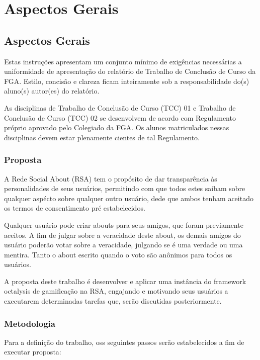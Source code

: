 \part{Aspectos Gerais}

\chapter[Aspectos Gerais]{Aspectos Gerais}

Estas instruções apresentam um conjunto mínimo de exigências necessárias a 
uniformidade de apresentação do relatório de Trabalho de Conclusão de Curso 
da FGA. Estilo, concisão e clareza ficam inteiramente sob a 
responsabilidade do(s) aluno(s) autor(es) do relatório.

As disciplinas de Trabalho de Conclusão de Curso (TCC) 01 e Trabalho de 
Conclusão de Curso (TCC) 02 se desenvolvem de acordo com Regulamento 
próprio aprovado pelo Colegiado da FGA. Os alunos matriculados nessas 
disciplinas devem estar plenamente cientes de tal Regulamento. 

\section{Proposta}
\label{sec:proposta}
A Rede Social About (RSA) tem o propósito de dar transparência às personalidades de seus usuários, permitindo com que todos
estes saibam sobre qualquer aspécto sobre qualquer outro usuário, dede que ambos tenham aceitado os
termos de consentimento pré estabelecidos.

Qualquer usuário pode criar abouts para seus amigos, que foram previamente aceitos. A fim de julgar
sobre a veracidade deste about, os demais amigos do usuário poderão votar sobre a veracidade,
julgando se é uma verdade ou uma mentira. Tanto o about escrito quando o voto são anônimos para todos os
usuários.

A proposta deste trabalho é desenvolver e aplicar uma instância do framework octalysis de gamificação na RSA, engajando e
motivando seus usuários a executarem determinadas tarefas que, serão discutidas posteriormente.



\section{Metodologia}
\label{sec:metodologia}

Para a definição do trabalho, oss seguintes
passos serão estabelecidos a fim de executar proposta:

